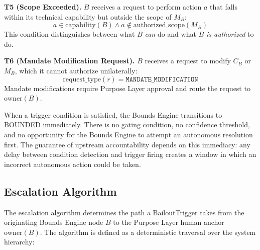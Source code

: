 \bigskip

\noindent\textbf{T5 (Scope Exceeded).} $B$ receives a request to perform action $a$ that falls within its technical capability but outside the scope of $M_B$:
\begin{equation}
a \in \text{capability}(B) \land a \notin \text{authorized\_scope}(M_B)
\end{equation}
This condition distinguishes between what $B$ \textit{can} do and what $B$ \textit{is authorized} to do.

\bigskip

\noindent\textbf{T6 (Mandate Modification Request).} $B$ receives a request to modify $C_B$ or $M_B$, which it cannot authorize unilaterally:
\begin{equation}
\text{request\_type}(r) = \texttt{MANDATE\_MODIFICATION}
\end{equation}
Mandate modifications require Purpose Layer approval and route the request to $\text{owner}(B)$.

\bigskip

When a trigger condition is satisfied, the Bounds Engine transitions to BOUNDED immediately. There is no gating condition, no confidence threshold, and no opportunity for the Bounds Engine to attempt an autonomous resolution first. The guarantee of upstream accountability depends on this immediacy: any delay between condition detection and trigger firing creates a window in which an incorrect autonomous action could be taken.

\subsection{Escalation Algorithm}
\label{sec:bailout-escalation}

The escalation algorithm determines the path a BailoutTrigger takes from the originating Bounds Engine node $B$ to the Purpose Layer human anchor $\text{owner}(B)$. The algorithm is defined as a deterministic traversal over the system hierarchy:

\bigskip

